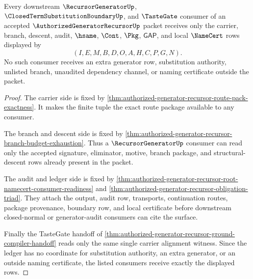 \begin{theorem}
\label{thm:authorized-generator-recursor-consumer-ledger-cover}
Every downstream $\RecursorGeneratorUp$,
$\ClosedTermSubstitutionBoundaryUp$, and $\TasteGate$ consumer of an
accepted $\AuthorizedGeneratorRecursorUp$ packet receives only the carrier,
branch, descent, audit, $\hsame$, $\Cont$, $\Pkg$, $\mathsf{GAP}$, and local
$\NameCert$ rows displayed by
$$
(I,E,M,B,D,O,A,H,C,P,G,N).
$$
No such consumer receives an extra generator row, substitution authority,
unlisted branch, unaudited dependency channel, or naming certificate outside
the packet.
\end{theorem}
\begin{proof}
The carrier side is fixed by
\autoref{thm:authorized-generator-recursor-route-pack-exactness}. It makes the
finite tuple the exact route package available to any consumer.

The branch and descent side is fixed by
\autoref{thm:authorized-generator-recursor-branch-budget-exhaustion}. Thus a
$\RecursorGeneratorUp$ consumer can read only the accepted signature,
eliminator, motive, branch package, and structural-descent rows already
present in the packet.

The audit and ledger side is fixed by
\autoref{thm:authorized-generator-recursor-root-namecert-consumer-readiness}
and \autoref{thm:authorized-generator-recursor-obligation-triad}. They attach
the output, audit row, transports, continuation routes, package provenance,
boundary row, and local certificate before downstream closed-normal or
generator-audit consumers can cite the surface.

Finally the TasteGate handoff of
\autoref{thm:authorized-generator-recursor-ground-compiler-handoff} reads only
the same single carrier alignment witness. Since the ledger has no coordinate
for substitution authority, an extra generator, or an outside naming
certificate, the listed consumers receive exactly the displayed rows.
\end{proof}

